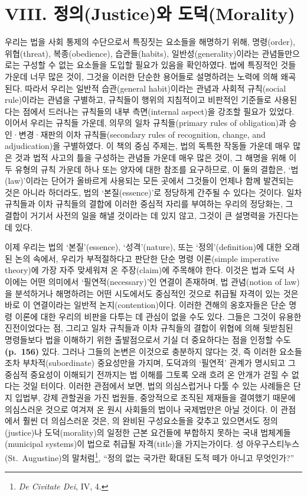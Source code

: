 \section{VIII. 정의(Justice)와
도덕(Morality)}\label{viii.-uxc815uxc758justiceuxc640-uxb3c4uxb355morality}

우리는 법을 사회 통제의 수단으로서 특징짓는 요소들을 해명하기 위해,
명령(order), 위협(threat), 복종(obedience), 습관들(habits),
일반성(generality)이라는 관념들만으로는 구성할 수 없는 요소들을 도입할
필요가 있음을 확인하였다. 법에 특징적인 것들 가운데 너무 많은 것이,
그것을 이러한 단순한 용어들로 설명하려는 노력에 의해 왜곡된다. 따라서
우리는 일반적 습관(general habit)이라는 관념과 사회적 규칙(social
rule)이라는 관념을 구별하고, 규칙들이 행위의 지침적이고 비판적인
기준들로 사용된다는 점에서 드러나는 규칙들의 내부 측면(internal
aspect)을 강조할 필요가 있었다. 이어서 우리는 규칙들 가운데, 의무의 일차
규칙들(primary rules of obligation)과 승인·변경·재판의 이차
규칙들(secondary rules of recognition, change, and adjudication)을
구별하였다. 이 책의 중심 주제는, 법의 독특한 작동들 가운데 매우 많은
것과 법적 사고의 틀을 구성하는 관념들 가운데 매우 많은 것이, 그 해명을
위해 이 두 유형의 규칙 가운데 하나 또는 양자에 대한 참조를 요구하므로,
이 둘의 결합은, ‘법(law)’이라는 단어가 올바르게 사용되는 모든 곳에서
그것들이 언제나 함께 발견되는 것은 아니라 하더라도, 법의
‘본질(essence)’로 정당하게 간주될 수 있다는 것이다. 일차 규칙들과 이차
규칙들의 결합에 이러한 중심적 자리를 부여하는 우리의 정당화는, 그 결합이
거기서 사전의 일을 해낼 것이라는 데 있지 않고, 그것이 큰 설명력을
가진다는 데 있다.

이제 우리는 법의 ‘본질’(essence), ‘성격’(nature), 또는
‘정의’(definition)에 대한 오래된 논의 속에서, 우리가 부적절하다고 판단한
단순 명령 이론(simple imperative theory)에 가장 자주 맞세워져 온
주장(claim)에 주목해야 한다. 이것은 법과 도덕 사이에는 어떤 의미에서
‘필연적(necessary)’인 연결이 존재하며, 법 관념(notion of law)을
분석하거나 해명하려는 어떤 시도에서도 중심적인 것으로 취급될 자격이 있는
것은 바로 이 연결이라는 일반적 논지(contention)이다. 이러한 견해의
옹호자들은 단순 명령 이론에 대한 우리의 비판을 다투는 데 관심이 없을
수도 있다. 그들은 그것이 유용한 진전이었다는 점, 그리고 일차 규칙들과
이차 규칙들의 결합이 위협에 의해 뒷받침된 명령들보다 법을 이해하기 위한
출발점으로서 기실 더 중요하다는 점을 인정할 수도 \textbf{(p.~156)} 있다.
그러나 그들의 논변은 이것으로 충분하지 않다는 것, 즉 이러한 요소들조차
부차적(subordinate) 중요성만을 가지며, 도덕과의 ‘필연적’ 관계가 명시되고
그 중심적 중요성이 이해되기 전까지는 법 이해를 그토록 오래 흐려 온
안개가 걷힐 수 없다는 것일 터이다. 이러한 관점에서 보면, 법의
의심스럽거나 다툴 수 있는 사례들은 단지 입법부, 강제 관할권을 가진
법원들, 중앙적으로 조직된 제재들을 결여했기 때문에 의심스러운 것으로
여겨져 온 원시 사회들의 법이나 국제법만은 아닐 것이다. 이 관점에서 훨씬
더 의심스러운 것은, 의 완비된 구성요소들을 갖추고 있으면서도 정의(justice)나
도덕(morality)의 일정한 근본 요건들에 부합하지 못하는 국내
법체계들(municipal systems)이 법으로 취급될 자격(title)을 가지는가이다.
성 아우구스티누스(St.~Augustine)의 말처럼\footnote{\emph{De Civitate
  Dei}, IV, 4.}, “정의 없는 국가란 확대된 도적 떼가 아니고 무엇인가?”

